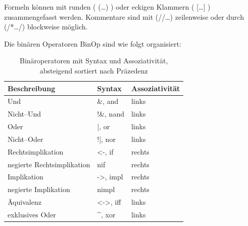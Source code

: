\documentclass[ngerman,a4paper,abstracton,open=right,twoside=false,toc=listofnumbered,bibtotocnumbered]{scrreprt}
\begin{document}
Formeln können mit runden ( (\dots) ) oder eckigen Klammern ( [\dots] ) zusammengefasst werden. Kommentare sind mit (//\dots) zeilenweise oder durch (/*\dots */) blockweise möglich.

Die binären Operatoren \glqq{}BinOp\grqq{} sind wie folgt organisiert:

\begin{table}[h]
	\begin{tabular}{|l|l|l|}
		\hline
		\textbf{Beschreibung} & \textbf{Syntax} & \textbf{Assoziativität} \\
		\hline
		Und & \&, and & links \\ \hline
		Nicht--Und & !\&, nand & links \\ \hline
		Oder & |, or & links \\ \hline
		Nicht--Oder & !|, nor & links \\ \hline
		Rechtsimplikation & <-, if & rechts \\ \hline
		negierte Rechtsimplikation & nif & rechts \\ \hline
		Implikation & ->, impl & rechts \\ \hline
		negierte Implikation & nimpl & rechts \\ \hline
		Äquivalenz & <->, iff & links \\ \hline
		exklusives Oder & \textasciicircum, xor & links \\ \hline
	\end{tabular}
	\caption{Binäroperatoren mit Syntax und Assoziativität, absteigend sortiert nach Präzedenz}
\end{table}
\end{document}
